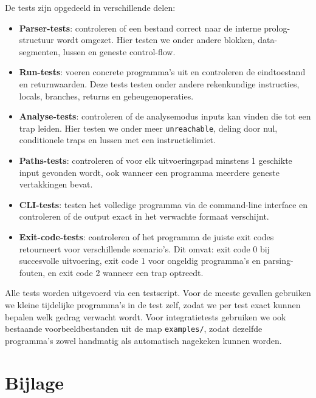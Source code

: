 \documentclass[a4paper,11pt]{article}
\begin{document}
De tests zijn opgedeeld in verschillende delen:

\begin{itemize}
    \item \textbf{Parser-tests}: controleren of een bestand correct naar de interne prolog-structuur wordt omgezet. Hier testen we onder andere blokken,
    data-segmenten, lussen en geneste control-flow.
    \item \textbf{Run-tests}: voeren concrete programma's uit en controleren de eindtoestand en returnwaarden. Deze tests testen onder andere
    rekenkundige instructies, locals, branches, returns en geheugenoperaties.
    \item \textbf{Analyse-tests}: controleren of de analysemodus inputs kan vinden die tot een trap leiden. Hier testen we onder meer \texttt{unreachable},
    deling door nul, conditionele traps en lussen met een instructielimiet.
    \item \textbf{Paths-tests}: controleren of voor elk uitvoeringspad minstens 1 geschikte input gevonden wordt, ook wanneer een programma meerdere geneste vertakkingen bevat.
    \item \textbf{CLI-tests}: testen het volledige programma via de command-line interface en controleren of de output exact in het verwachte formaat verschijnt.
    \item \textbf{Exit-code-tests}: controleren of het programma de juiste exit codes retourneert voor verschillende scenario's. Dit omvat: exit code 0 bij succesvolle uitvoering, exit code 1 voor ongeldig programma's en parsing-fouten, en exit code 2 wanneer een trap optreedt.
\end{itemize}

Alle tests worden uitgevoerd via een testscript. Voor de meeste gevallen gebruiken we kleine tijdelijke programma's in de test zelf, zodat we per test exact kunnen bepalen
welk gedrag verwacht wordt. Voor integratietests gebruiken we ook bestaande voorbeeldbestanden uit de map \texttt{examples/}, zodat dezelfde programma's zowel
handmatig als automatisch nagekeken kunnen worden.

\newpage
\appendix
\section{Bijlage}
\end{document}
